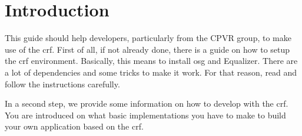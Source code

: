\section{Introduction}

This guide should help developers, particularly from the CPVR group, to make use of the \gls{crf}. First of all, if not already done, there is a guide on how to setup the \gls{crf} environment. Basically, this means to install \gls{osg} and Equalizer. There are a lot of dependencies and some tricks to make it work. For that reason, read and follow the instructions carefully.

In a second step, we provide some information on how to develop with the \gls{crf}. You are introduced on what basic implementations you have to make to build your own application based on the \gls{crf}.
